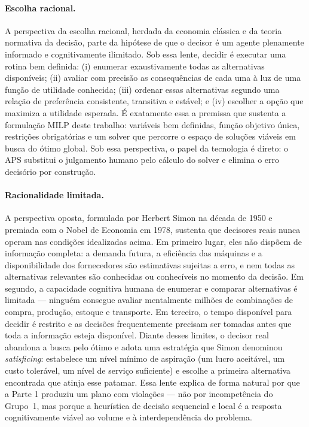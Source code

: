\documentclass[11pt,a4paper]{article}
\begin{document}
\paragraph{Escolha racional.} A perspectiva da escolha racional, herdada da economia clássica e da teoria normativa da decisão, parte da hipótese de que o decisor é um agente plenamente informado e cognitivamente ilimitado. Sob essa lente, decidir é executar uma rotina bem definida: (i) enumerar exaustivamente todas as alternativas disponíveis; (ii) avaliar com precisão as consequências de cada uma à luz de uma função de utilidade conhecida; (iii) ordenar essas alternativas segundo uma relação de preferência consistente, transitiva e estável; e (iv) escolher a opção que maximiza a utilidade esperada. É exatamente essa a premissa que sustenta a formulação MILP deste trabalho: variáveis bem definidas, função objetivo única, restrições obrigatórias e um solver que percorre o espaço de soluções viáveis em busca do ótimo global. Sob essa perspectiva, o papel da tecnologia é direto: o APS substitui o julgamento humano pelo cálculo do solver e elimina o erro decisório por construção.

\paragraph{Racionalidade limitada.} A perspectiva oposta, formulada por Herbert Simon na década de 1950 e premiada com o Nobel de Economia em 1978, sustenta que decisores reais nunca operam nas condições idealizadas acima. Em primeiro lugar, eles não dispõem de informação completa: a demanda futura, a eficiência das máquinas e a disponibilidade dos fornecedores são estimativas sujeitas a erro, e nem todas as alternativas relevantes são conhecidas ou conhecíveis no momento da decisão. Em segundo, a capacidade cognitiva humana de enumerar e comparar alternativas é limitada --- ninguém consegue avaliar mentalmente milhões de combinações de compra, produção, estoque e transporte. Em terceiro, o tempo disponível para decidir é restrito e as decisões frequentemente precisam ser tomadas antes que toda a informação esteja disponível. Diante desses limites, o decisor real abandona a busca pelo ótimo e adota uma estratégia que Simon denominou \emph{satisficing}: estabelece um nível mínimo de aspiração (um lucro aceitável, um custo tolerável, um nível de serviço suficiente) e escolhe a primeira alternativa encontrada que atinja esse patamar. Essa lente explica de forma natural por que a Parte 1 produziu um plano com violações --- não por incompetência do Grupo~1, mas porque a heurística de decisão sequencial e local é a resposta cognitivamente viável ao volume e à interdependência do problema.
\end{document}
